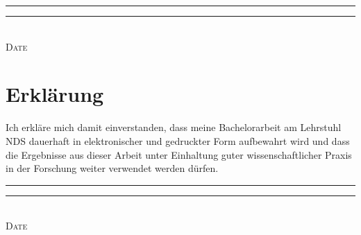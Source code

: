 \makeatletter
\vspace{2cm}
\rule{4cm}{0.1pt} \hfill \rule{7cm}{0.1pt} \\
\hspace*{1.5cm} \textsc{Date} \hspace*{7cm} \textsc{\@author}
\makeatother

\cleardoublepage

\section*{Erklärung}
{
Ich erkläre mich damit einverstanden, dass meine Bachelorarbeit am
Lehrstuhl NDS dauerhaft in elektronischer und gedruckter Form aufbewahrt
wird und dass die Ergebnisse aus dieser Arbeit unter Einhaltung guter
wissenschaftlicher Praxis in der Forschung weiter verwendet werden dürfen.\@}

\makeatletter
\vspace{2cm}
\rule{4cm}{0.1pt} \hfill \rule{7cm}{0.1pt} \\
\hspace*{1.5cm} \textsc{Date} \hspace*{7cm} \textsc{\@author}
\makeatother

\cleardoublepage

\pagestyle{scrheadings} %

\tableofcontents

\cleardoublepage

